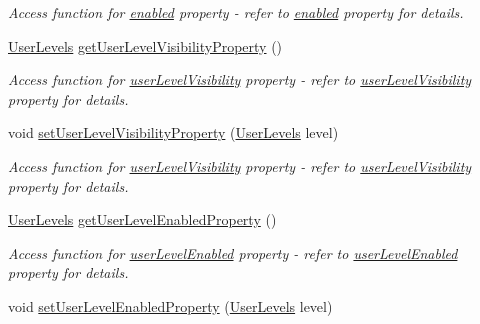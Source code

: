 \begin{DoxyCompactItemize}
\begin{DoxyCompactList}\small\item\em Access function for \hyperlink{classQEImage_aa7622e2272c1c1bdd0f51b6bfb9ec048}{enabled} property -\/ refer to \hyperlink{classQEImage_aa7622e2272c1c1bdd0f51b6bfb9ec048}{enabled} property for details. \end{DoxyCompactList}\item 
\hypertarget{classQEImage_ab972dd9c0c2571caa588bc4e86dfc993}{
\hyperlink{classQEImage_afc6169e5bb55dd0d3757ba09e3afe335}{UserLevels} \hyperlink{classQEImage_ab972dd9c0c2571caa588bc4e86dfc993}{getUserLevelVisibilityProperty} ()}
\label{classQEImage_ab972dd9c0c2571caa588bc4e86dfc993}

\begin{DoxyCompactList}\small\item\em Access function for \hyperlink{classQEImage_a777c21b8780f53a99f930ca19dc5cbe5}{userLevelVisibility} property -\/ refer to \hyperlink{classQEImage_a777c21b8780f53a99f930ca19dc5cbe5}{userLevelVisibility} property for details. \end{DoxyCompactList}\item 
\hypertarget{classQEImage_a4ea54cae6c745283982ce58b2e9cf919}{
void \hyperlink{classQEImage_a4ea54cae6c745283982ce58b2e9cf919}{setUserLevelVisibilityProperty} (\hyperlink{classQEImage_afc6169e5bb55dd0d3757ba09e3afe335}{UserLevels} level)}
\label{classQEImage_a4ea54cae6c745283982ce58b2e9cf919}

\begin{DoxyCompactList}\small\item\em Access function for \hyperlink{classQEImage_a777c21b8780f53a99f930ca19dc5cbe5}{userLevelVisibility} property -\/ refer to \hyperlink{classQEImage_a777c21b8780f53a99f930ca19dc5cbe5}{userLevelVisibility} property for details. \end{DoxyCompactList}\item 
\hypertarget{classQEImage_adc671ee1c66c286782b3670050b1ffe3}{
\hyperlink{classQEImage_afc6169e5bb55dd0d3757ba09e3afe335}{UserLevels} \hyperlink{classQEImage_adc671ee1c66c286782b3670050b1ffe3}{getUserLevelEnabledProperty} ()}
\label{classQEImage_adc671ee1c66c286782b3670050b1ffe3}

\begin{DoxyCompactList}\small\item\em Access function for \hyperlink{classQEImage_a25b8ba9d335dce7a4fd1eb9de3c62446}{userLevelEnabled} property -\/ refer to \hyperlink{classQEImage_a25b8ba9d335dce7a4fd1eb9de3c62446}{userLevelEnabled} property for details. \end{DoxyCompactList}\item 
\hypertarget{classQEImage_aa4182eb575eed07bc5518774eea62f7a}{
void \hyperlink{classQEImage_aa4182eb575eed07bc5518774eea62f7a}{setUserLevelEnabledProperty} (\hyperlink{classQEImage_afc6169e5bb55dd0d3757ba09e3afe335}{UserLevels} level)}
\label{classQEImage_aa4182eb575eed07bc5518774eea62f7a}


\end{DoxyCompactItemize}
